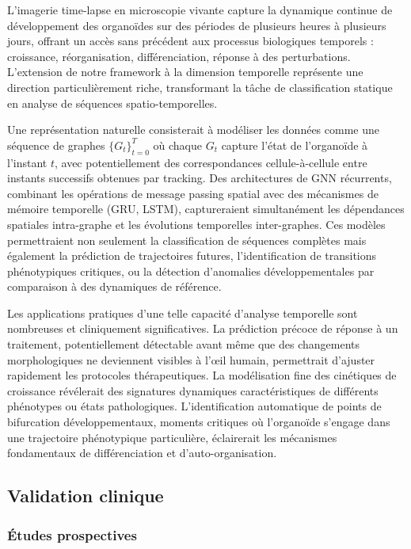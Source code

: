 L'imagerie time-lapse en microscopie vivante capture la dynamique continue de développement des organoïdes sur des périodes de plusieurs heures à plusieurs jours, offrant un accès sans précédent aux processus biologiques temporels : croissance, réorganisation, différenciation, réponse à des perturbations. L'extension de notre framework à la dimension temporelle représente une direction particulièrement riche, transformant la tâche de classification statique en analyse de séquences spatio-temporelles.

Une représentation naturelle consisterait à modéliser les données comme une séquence de graphes $\{G_t\}_{t=0}^T$ où chaque $G_t$ capture l'état de l'organoïde à l'instant $t$, avec potentiellement des correspondances cellule-à-cellule entre instants successifs obtenues par tracking. Des architectures de GNN récurrents, combinant les opérations de message passing spatial avec des mécanismes de mémoire temporelle (GRU, LSTM), captureraient simultanément les dépendances spatiales intra-graphe et les évolutions temporelles inter-graphes. Ces modèles permettraient non seulement la classification de séquences complètes mais également la prédiction de trajectoires futures, l'identification de transitions phénotypiques critiques, ou la détection d'anomalies développementales par comparaison à des dynamiques de référence.

Les applications pratiques d'une telle capacité d'analyse temporelle sont nombreuses et cliniquement significatives. La prédiction précoce de réponse à un traitement, potentiellement détectable avant même que des changements morphologiques ne deviennent visibles à l'œil humain, permettrait d'ajuster rapidement les protocoles thérapeutiques. La modélisation fine des cinétiques de croissance révélerait des signatures dynamiques caractéristiques de différents phénotypes ou états pathologiques. L'identification automatique de points de bifurcation développementaux, moments critiques où l'organoïde s'engage dans une trajectoire phénotypique particulière, éclairerait les mécanismes fondamentaux de différenciation et d'auto-organisation.

\subsection{Validation clinique}

\subsubsection{Études prospectives}

